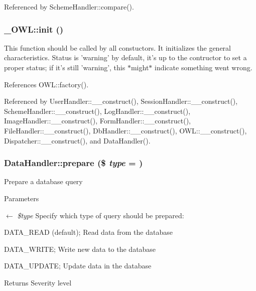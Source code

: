 Referenced by SchemeHandler::compare().

\subsubsection[{init}]{\setlength{\rightskip}{0pt plus 5cm}\_\-OWL::init ()}\label{class__OWL_ae0ef3ded56e8a6b34b6461e5a721cd3e}
This function should be called by all constuctors. It initializes the general characteristics. Status is 'warning' by default, it's up to the contructor to set a proper status; if it's still 'warning', this $\ast$might$\ast$ indicate something went wrong. 

References OWL::factory().



Referenced by UserHandler::\_\-\_\-construct(), SessionHandler::\_\-\_\-construct(), SchemeHandler::\_\-\_\-construct(), LogHandler::\_\-\_\-construct(), ImageHandler::\_\-\_\-construct(), FormHandler::\_\-\_\-construct(), FileHandler::\_\-\_\-construct(), DbHandler::\_\-\_\-construct(), OWL::\_\-\_\-construct(), Dispatcher::\_\-\_\-construct(), and DataHandler().

\subsubsection[{prepare}]{\setlength{\rightskip}{0pt plus 5cm}DataHandler::prepare (\$ {\em type} = {})}\label{classDataHandler_af3e7a17194e97300d499e9178f4913cb}
Prepare a database query


\begin{DoxyParams}{Parameters}
\item[\mbox{$\leftarrow$} {\em \$type}]Specify which type of query should be prepared:
\begin{DoxyItemize}
\item DATA\_\-READ (default); Read data from the database
\item DATA\_\-WRITE; Write new data to the database
\item DATA\_\-UPDATE; Update data in the database 
\end{DoxyItemize}\end{DoxyParams}
\begin{DoxyReturn}{Returns}
Severity level 
\end{DoxyReturn}


